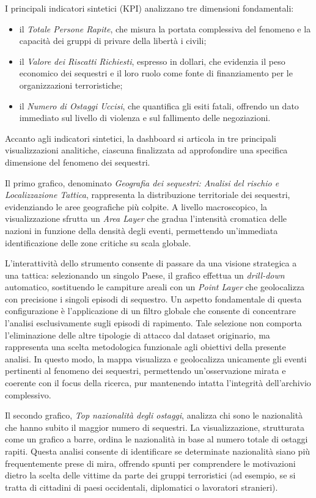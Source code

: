 I principali indicatori sintetici (KPI) analizzano tre dimensioni fondamentali:
\begin{itemize}
    \item il \textit{Totale Persone Rapite}, che misura la portata complessiva del fenomeno e la capacità dei gruppi di privare della libertà i civili;
    \item il \textit{Valore dei Riscatti Richiesti}, espresso in dollari, che evidenzia il peso economico dei sequestri e il loro ruolo come fonte di finanziamento per le organizzazioni terroristiche;
    \item il \textit{Numero di Ostaggi Uccisi}, che quantifica gli esiti fatali, offrendo un dato immediato sul livello di violenza e sul fallimento delle negoziazioni.
\end{itemize}

Accanto agli indicatori sintetici, la dashboard si articola in tre principali visualizzazioni analitiche, ciascuna finalizzata ad approfondire una specifica dimensione del fenomeno dei sequestri.

Il primo grafico, denominato \textit{Geografia dei sequestri: Analisi del rischio e Localizzazione Tattica}, rappresenta la distribuzione territoriale dei sequestri, evidenziando le aree geografiche più colpite.
A livello macroscopico, la visualizzazione sfrutta un \textit{Area Layer} che gradua l'intensità cromatica delle nazioni in funzione della densità degli eventi, permettendo un'immediata identificazione delle zone critiche su scala globale.

L'interattività dello strumento consente di passare da una visione strategica a una tattica: selezionando un singolo Paese, il grafico effettua un \textit{drill-down} automatico, sostituendo le campiture areali con un \textit{Point Layer} che geolocalizza con precisione i singoli episodi di sequestro.
Un aspetto fondamentale di questa configurazione è l’applicazione di un filtro globale che consente di concentrare l’analisi esclusivamente sugli episodi di rapimento. Tale selezione non comporta l’eliminazione delle altre tipologie di attacco dal dataset originario, ma rappresenta una scelta metodologica funzionale agli obiettivi della presente analisi. In questo modo, la mappa visualizza e geolocalizza unicamente gli eventi pertinenti al fenomeno dei sequestri, permettendo un’osservazione mirata e coerente con il focus della ricerca, pur mantenendo intatta l’integrità dell’archivio complessivo.

Il secondo grafico, \textit{Top nazionalità degli ostaggi}, analizza chi sono le nazionalità che hanno subito il maggior numero di sequestri. La visualizzazione, strutturata come un grafico a barre, ordina le nazionalità in base al numero totale di ostaggi rapiti. Questa analisi consente di identificare se determinate nazionalità siano più frequentemente prese di mira, offrendo spunti per comprendere le motivazioni dietro la scelta delle vittime da parte dei gruppi terroristici (ad esempio, se si tratta di cittadini di paesi occidentali, diplomatici o lavoratori stranieri).

